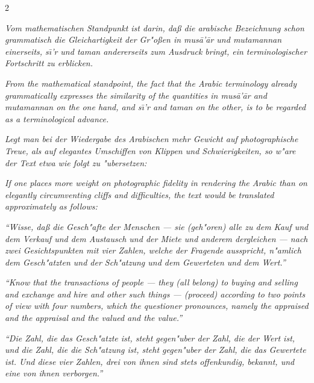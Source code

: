 \documentclass[10pt,a4paper]{article}
\newcommand{\enquote}[1]{``#1''}
\begin{document}
\begin{paracol}{2}
\switchcolumn*

\textit{Vom mathematischen Standpunkt ist darin, da\ss{} die arabische Bezeichnung schon grammatisch die Gleichartigkeit der Gr"o\ss{}en in \textit{mus\=a'\=ar} und \textit{mutamannan} einerseits, \textit{s\=\i'r} und \textit{taman} andererseits zum Ausdruck bringt, ein terminologischer Fortschritt zu erblicken.}

\switchcolumn

\textit{From the mathematical standpoint, the fact that the Arabic terminology already grammatically expresses the similarity of the quantities in \textit{mus\=a'\=ar} and \textit{mutamannan} on the one hand, and \textit{s\=\i'r} and \textit{taman} on the other, is to be regarded as a terminological advance.}

\switchcolumn*

\textit{Legt man bei der Wiedergabe des Arabischen mehr Gewicht auf photographische Treue, als auf elegantes Umschiffen von Klippen und Schwierigkeiten, so w"are der Text etwa wie folgt zu "ubersetzen:}

\switchcolumn

\textit{If one places more weight on photographic fidelity in rendering the Arabic than on elegantly circumventing cliffs and difficulties, the text would be translated approximately as follows:}

\switchcolumn*

\textit{\enquote{Wisse, da\ss{} die Gesch"afte der Menschen --- sie (geh"oren) alle zu dem Kauf und dem Verkauf und dem Austausch und der Miete und anderem dergleichen --- nach zwei Gesichtspunkten mit vier Zahlen, welche der Fragende ausspricht, n"amlich dem Gesch"atzten und der Sch"atzung und dem Gewerteten und dem Wert.}}

\switchcolumn

\textit{\enquote{Know that the transactions of people --- they (all belong) to buying and selling and exchange and hire and other such things --- (proceed) according to two points of view with four numbers, which the questioner pronounces, namely the appraised and the appraisal and the valued and the value.}}

\switchcolumn*

\textit{\enquote{Die Zahl, die das Gesch"atzte ist, steht gegen"uber der Zahl, die der Wert ist, und die Zahl, die die Sch"atzung ist, steht gegen"uber der Zahl, die das Gewertete ist. Und diese vier Zahlen, drei von ihnen sind stets offenkundig, bekannt, und eine von ihnen verborgen.}}


\end{paracol}
\end{document}
